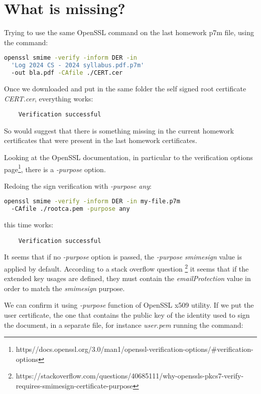 \documentclass{article}
\begin{document}
\section{What is missing?}

Trying to use the same OpenSSL command on the last homework p7m file,  using the command:

\begin{lstlisting}[language=bash]
openssl smime -verify -inform DER -in 
  'Log 2024 CS - 2024 syllabus.pdf.p7m' 
  -out bla.pdf -CAfile ./CERT.cer
\end{lstlisting}

Once we downloaded and put in the same folder the self signed root certificate \emph{CERT.cer},
everything works:
\begin{verbatim}
	Verification successful
\end{verbatim}

So would suggest that there is something missing in the current homework certificates that were present 
in the last homework certificates.

Looking at the OpenSSL documentation,
in particular to the verification options page\footnote{
	https\://docs.openssl.org/3.0/man1/openssl-verification-options/\#verification-options
}, there is a \emph{-purpose} option.

Redoing the sign verification with \emph{-purpose any}:

\begin{lstlisting}[language=bash]
openssl smime -verify -inform DER -in my-file.p7m 
  -CAfile ./rootca.pem -purpose any
\end{lstlisting}

this time works:
\begin{verbatim}
	Verification successful
\end{verbatim}

It seems that if no \emph{-purpose} option is passed, 
the \emph{-purpose smimesign} value is applied by default.
According to a stack overflow question \footnote{
	https://stackoverflow.com/questions/40685111/why-openssls-pkcs7-verify-requires-smimesign-certificate-purpose
} 
it seems that if the extended key usages are defined, they must contain the \emph{emailProtection} 
value in order to match the \emph{smimesign} purpose.

We can confirm it using \emph{-purpose} function of OpenSSL x509 utility.
If we put the user certificate, the one that contains the public key of the identity used to sign the document,
in a separate file, for instance \emph{user.pem} running the command:
\end{document}
